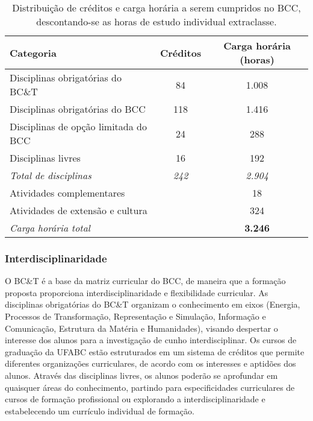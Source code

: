 \begin{table}[h!]
    \centering
    \caption{Distribuição de créditos e carga horária a serem cumpridos no BCC,
    descontando-se as horas de estudo individual extraclasse.}
    \label{tab:carga_horaria}
    \begin{tabular}{|l|c|c|}
        \hline
        \textbf{Categoria}                        & \textbf{Créditos} & \textbf{Carga horária (horas)} \\
        \hline\hline
        Disciplinas obrigatórias do BC\&T         & 84                & 1.008 \\
        \hline
        Disciplinas obrigatórias do BCC           & 118               & 1.416 \\
        \hline
        Disciplinas de opção limitada do BCC      & 24                & 288 \\
        \hline
        Disciplinas livres                        & 16                 & 192 \\
        \hline
        \textit{Total de disciplinas}                            & \textit{242}               & \textit{2.904}\\
        \hline\hline
        \multicolumn{2}{|l|}{Atividades complementares}            & 18 \\
        \hline
        \multicolumn{2}{|l|}{Atividades de extensão e cultura}      & 324 \\
        \hline
        \multicolumn{2}{|l|}{\textit{Carga horária total}}               & \textbf{3.246}\\
        \hline
    \end{tabular}
\end{table}




\subsubsection{Interdisciplinaridade}

O BC\&T é a base da matriz curricular do BCC, de maneira que a formação
proposta proporciona interdisciplinaridade e flexibilidade curricular.
As disciplinas obrigatórias do BC\&T organizam o conhecimento em eixos
(Energia, Processos de Transformação, Representação e Simulação, Informação e
Comunicação, Estrutura da Matéria e Humanidades), visando despertar o interesse
dos alunos para a investigação de cunho interdisciplinar.
Os cursos de graduação da UFABC estão estruturados em um sistema de créditos
que permite diferentes organizações curriculares, de acordo com os interesses e
aptidões dos alunos.
Através das disciplinas livres, os alunos poderão se aprofundar em quaisquer
áreas do conhecimento, partindo para especificidades curriculares de cursos de
formação profissional ou explorando a interdisciplinaridade e estabelecendo um
currículo individual de formação.

